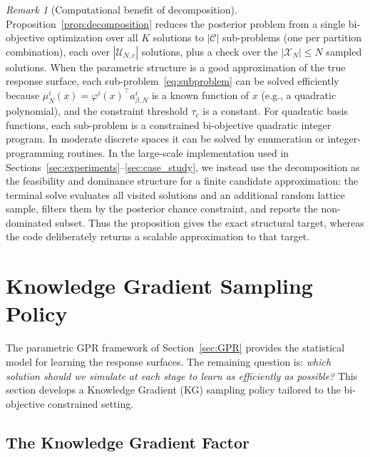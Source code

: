 \documentclass[12pt]{article}
\theoremstyle{plain}
\theoremstyle{definition}
\theoremstyle{remark}
\newtheorem{remark}{Remark}[section]
\begin{document}
\begin{remark}[Computational benefit of decomposition]\label{rem:decomposition}
Proposition~\ref{prop:decomposition} reduces the posterior problem from a single bi-objective optimization over all $K$ solutions to $|\mathcal{C}|$ sub-problems (one per partition combination), each over $|\mathcal{U}_{N,c}|$ solutions, plus a check over the $|\mathcal{X}_N| \leq N$ sampled solutions. When the parametric structure is a good approximation of the true response surface, each sub-problem~\eqref{eq:subproblem} can be solved efficiently because $\mu^i_N(x) = \varphi^i(x)^\top a^i_{\beta,N}$ is a known function of $x$ (e.g., a quadratic polynomial), and the constraint threshold $\tau_c$ is a constant. For quadratic basis functions, each sub-problem is a constrained bi-objective quadratic integer program. In moderate discrete spaces it can be solved by enumeration or integer-programming routines. In the large-scale implementation used in Sections~\ref{sec:experiments}--\ref{sec:case_study}, we instead use the decomposition as the feasibility and dominance structure for a finite candidate approximation: the terminal solve evaluates all visited solutions and an additional random lattice sample, filters them by the posterior chance constraint, and reports the non-dominated subset. Thus the proposition gives the exact structural target, whereas the code deliberately returns a scalable approximation to that target.
\end{remark}



\section{Knowledge Gradient Sampling Policy}\label{sec:KG}

The parametric GPR framework of Section~\ref{sec:GPR} provides the statistical model for learning the response surfaces. The remaining question is: \emph{which solution should we simulate at each stage to learn as efficiently as possible?} This section develops a Knowledge Gradient (KG) sampling policy tailored to the bi-objective constrained setting.

\subsection{The Knowledge Gradient Factor}\label{subsec:KG_factor}
\end{document}

